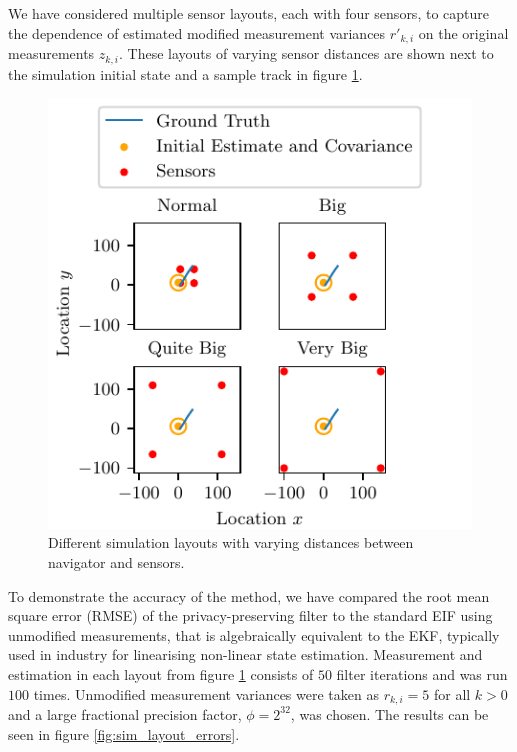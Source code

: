 \documentclass[10pt,letterpaper,oneside,twocolumn,journal]{IEEEtran}
\theoremstyle{definition}
\theoremstyle{definition}
\theoremstyle{remark}
\begin{document}
We have considered multiple sensor layouts, each with four sensors, to capture the dependence of estimated modified measurement variances $r'_{k,i}$ on the original measurements $z_{k,i}$. These layouts of varying sensor distances are shown next to the simulation initial state and a sample track in figure \ref{fig:sim_layouts}.
\begin{figure}[htbp]
    \centering
    \includegraphics{images/layouts.pdf}
    \caption{Different simulation layouts with varying distances between navigator and sensors.}
    \label{fig:sim_layouts}
\end{figure}
To demonstrate the accuracy of the method, we have compared the root mean square error (RMSE) of the privacy-preserving filter to the standard EIF using unmodified measurements, that is algebraically equivalent to the EKF, typically used in industry for linearising non-linear state estimation. Measurement and estimation in each layout from figure \ref{fig:sim_layouts} consists of $50$ filter iterations and was run $100$ times. Unmodified measurement variances were taken as $r_{k,i}=5$ for all $k>0$ and a large fractional precision factor, $\phi=2^{32}$, was chosen. The results can be seen in figure \ref{fig:sim_layout_errors}.
\end{document}
